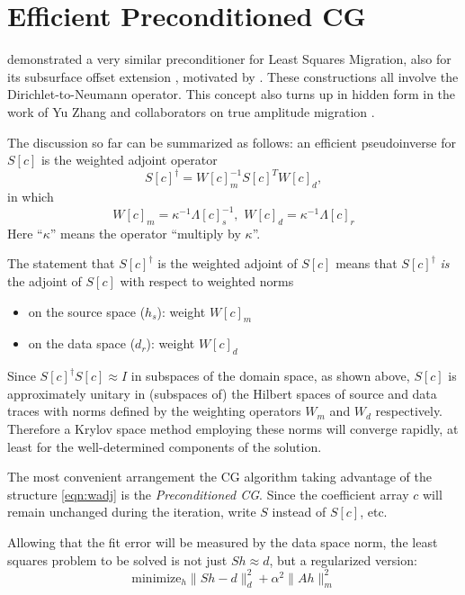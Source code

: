 \section{Efficient Preconditioned CG}

\cite{HouSymes:EAGE16} demonstrated a very similar preconditioner for Least Squares Migration, also for its subsurface offset extension \cite[]{HouSymes:16}, motivated by \cite{tenKroode:12}. These constructions all involve the Dirichlet-to-Neumann operator. This concept also turns up in hidden form in the work of Yu Zhang and collaborators on true amplitude migration \cite[]{YuZhang:14,TangXuZhang:13,XuWang:2012,XuZhangTang:11,Zhang:SEG09,Zhang YuSun:08,ZhangSunGray:07,ZhangBleistein:05,Bleisteinetal:05}. 

The discussion so far can be summarized as follows: an efficient pseudoinverse for $S[c]$ is the weighted adjoint operator
\begin{equation}
\label{eqn:wadj}
S[c]^{\dagger} = W[c]_m^{-1}S[c]^TW[c]_d,
\end{equation}
in which 
\begin{equation}
\label{eqn:weights}
W[c]_m = \kappa^{-1}\Lambda[c]^{-1}_s,\,\, W[c]_d = \kappa^{-1}\Lambda[c]_r
\end{equation}
Here ``$\kappa$'' means the operator ``multiply by $\kappa$''.

The statement that $S[c]^{\dagger}$ is the weighted adjoint of $S[c]$ means that $S[c]^{\dagger}$ {\em is} the adjoint of $S[c]$ with respect to weighted norms 
\begin{itemize}
\item on the source space ($h_s$): weight $W[c]_m$
\item on the data space ($d_r$): weight $W[c]_d$
\end{itemize}
Since $S[c]^{\dagger}S[c] \approx I$ in subspaces of the domain space, as shown above, $S[c]$ is approximately unitary in (subspaces of) the Hilbert spaces of source and data traces with norms defined by the weighting operators $W_m$ and $W_d$ respectively. Therefore a Krylov space method employing these norms will converge rapidly, at least for the well-determined components of the solution.

The most convenient arrangement the CG algorithm taking advantage of the structure \ref{eqn:wadj} is the {\em Preconditioned CG}. Since the coefficient array $c$ will remain unchanged during the iteration, write $S$ instead of $S[c]$, etc. 

Allowing that the fit error will be measured by the data space norm, the least squares problem to be solved is not just $Sh \approx d$, but a regularized version:
\begin{equation}
  \label{eqn:einv}
  \mbox{minimize}_h \|Sh-d\|^2_d + \alpha^2 \|Ah\|^2_m
\end{equation}

